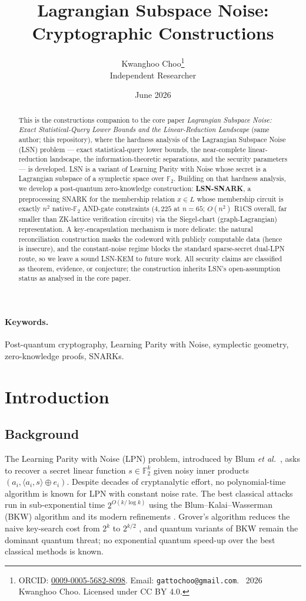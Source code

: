 \documentclass[11pt,a4paper]{article}
\title{Lagrangian Subspace Noise: \\ Cryptographic Constructions}
\author{Kwanghoo Choo\thanks{ORCID: \href{https://orcid.org/0009-0005-5682-8098}{0009-0005-5682-8098}. Email: \texttt{gattochoo@gmail.com}. \textcopyright~2026 Kwanghoo Choo. Licensed under CC BY 4.0.}\\ \normalsize Independent Researcher}
\date{June 2026}
\theoremstyle{plain}
\theoremstyle{definition}
\newcommand{\F}{\mathbb{F}}
\newcommand{\etal}{\textit{et al.}}
\begin{document}
\maketitle

\begin{abstract}
This is the constructions companion to the core paper \emph{Lagrangian Subspace Noise: Exact Statistical-Query Lower Bounds and the Linear-Reduction Landscape} (same author; this repository), where the hardness analysis of the Lagrangian Subspace Noise (LSN) problem --- exact statistical-query lower bounds, the near-complete linear-reduction landscape, the information-theoretic separations, and the security parameters --- is developed. LSN is a variant of Learning Parity with Noise whose secret is a Lagrangian subspace of a symplectic space over $\F_2$. Building on that hardness analysis, we develop a post-quantum zero-knowledge construction: \textbf{LSN-SNARK}, a preprocessing SNARK for the membership relation $x \in L$ whose membership circuit is exactly $n^2$ native-$\F_2$ AND-gate constraints ($4{,}225$ at $n=65$; $O(n^2)$ R1CS overall, far smaller than ZK-lattice verification circuits) via the Siegel-chart (graph-Lagrangian) representation. A key-encapsulation mechanism is more delicate: the natural reconciliation construction masks the codeword with publicly computable data (hence is insecure), and the constant-noise regime blocks the standard sparse-secret dual-LPN route, so we leave a sound LSN-KEM to future work. All security claims are classified as theorem, evidence, or conjecture; the construction inherits LSN's open-assumption status as analysed in the core paper.
\end{abstract}

\paragraph{\textbf{Keywords.}} Post-quantum cryptography, Learning Parity with Noise, symplectic geometry, zero-knowledge proofs, SNARKs.

\section{Introduction}
\label{sec:intro}

\subsection{Background}
\label{subsec:background}

The Learning Parity with Noise (LPN) problem, introduced by Blum \etal\ \cite{BFKL94}, asks to recover a secret linear function $s \in \F_2^k$ given noisy inner products $(a_i, \langle a_i, s \rangle \oplus e_i)$. Despite decades of cryptanalytic effort, no polynomial-time algorithm is known for LPN with constant noise rate. The best classical attacks run in sub-exponential time $2^{O(k / \log k)}$ using the Blum--Kalai--Wasserman (BKW) algorithm \cite{BKW03} and its modern refinements \cite{LF06,Lyu05,EKM17,GJL14,Kir11}. Grover's algorithm reduces the naive key-search cost from $2^k$ to $2^{k/2}$ \cite{Gro96}, and quantum variants of BKW remain the dominant quantum threat; no exponential quantum speed-up over the best classical methods is known.
\end{document}
